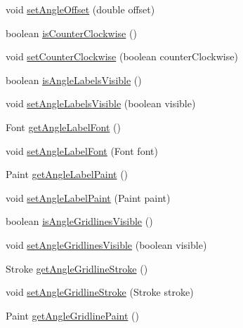 \begin{DoxyCompactItemize}
\item 
void \mbox{\hyperlink{classorg_1_1jfree_1_1chart_1_1plot_1_1_polar_plot_af7db4e2fc7a6b978b7d62feaa6f63a53}{set\+Angle\+Offset}} (double offset)
\item 
boolean \mbox{\hyperlink{classorg_1_1jfree_1_1chart_1_1plot_1_1_polar_plot_ad6633efc8529f94a4fcb4a0fc284cf5a}{is\+Counter\+Clockwise}} ()
\item 
void \mbox{\hyperlink{classorg_1_1jfree_1_1chart_1_1plot_1_1_polar_plot_a1fba4b1826ae0c7ab27bf9cbbd9db559}{set\+Counter\+Clockwise}} (boolean counter\+Clockwise)
\item 
boolean \mbox{\hyperlink{classorg_1_1jfree_1_1chart_1_1plot_1_1_polar_plot_a065406a06be64510889c2f61ef57da30}{is\+Angle\+Labels\+Visible}} ()
\item 
void \mbox{\hyperlink{classorg_1_1jfree_1_1chart_1_1plot_1_1_polar_plot_a8cb293fa3da434fb3ebcbe1ef1ccb435}{set\+Angle\+Labels\+Visible}} (boolean visible)
\item 
Font \mbox{\hyperlink{classorg_1_1jfree_1_1chart_1_1plot_1_1_polar_plot_a928d0e6ae6b209ca6172b710c0b2190a}{get\+Angle\+Label\+Font}} ()
\item 
void \mbox{\hyperlink{classorg_1_1jfree_1_1chart_1_1plot_1_1_polar_plot_aa61cfe599a9676f076e216b90e109327}{set\+Angle\+Label\+Font}} (Font font)
\item 
Paint \mbox{\hyperlink{classorg_1_1jfree_1_1chart_1_1plot_1_1_polar_plot_a49fff6f13418a4bce1c3d20ed9e24927}{get\+Angle\+Label\+Paint}} ()
\item 
void \mbox{\hyperlink{classorg_1_1jfree_1_1chart_1_1plot_1_1_polar_plot_a99d459dade42417f00c7cd05f506b9a5}{set\+Angle\+Label\+Paint}} (Paint paint)
\item 
boolean \mbox{\hyperlink{classorg_1_1jfree_1_1chart_1_1plot_1_1_polar_plot_ad7bfe305f21e04763265a67ef06fffac}{is\+Angle\+Gridlines\+Visible}} ()
\item 
void \mbox{\hyperlink{classorg_1_1jfree_1_1chart_1_1plot_1_1_polar_plot_aae818235a04355524317e03c5ff60429}{set\+Angle\+Gridlines\+Visible}} (boolean visible)
\item 
Stroke \mbox{\hyperlink{classorg_1_1jfree_1_1chart_1_1plot_1_1_polar_plot_ae470d6938a98ac9f390c401538c3b546}{get\+Angle\+Gridline\+Stroke}} ()
\item 
void \mbox{\hyperlink{classorg_1_1jfree_1_1chart_1_1plot_1_1_polar_plot_aba972a51d5f2fb96266662106a3fa01c}{set\+Angle\+Gridline\+Stroke}} (Stroke stroke)
\item 
Paint \mbox{\hyperlink{classorg_1_1jfree_1_1chart_1_1plot_1_1_polar_plot_a00462036e7ec80bdf00e78b0aea657f2}{get\+Angle\+Gridline\+Paint}} ()

\end{DoxyCompactItemize}
